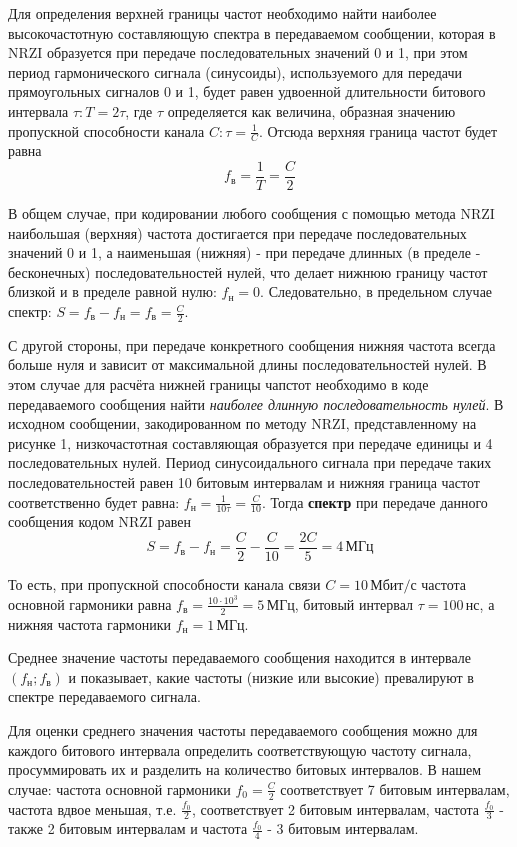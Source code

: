 Для определения верхней границы частот необходимо найти наиболее высокочастотную составляющую спектра в передаваемом сообщении, которая в NRZI образуется при передаче последовательных значений 0 и 1, при этом период гармонического сигнала (синусоиды), используемого для передачи прямоугольных сигналов 0 и 1, будет равен удвоенной длительности битового интервала $\tau: T = 2\tau$, где $\tau$ определяется как величина, образная значению пропускной способности канала $C: \tau = \frac{1}{C}$. Отсюда верхняя граница частот будет равна \[f_{\text{в}} = \frac{1}{T} = \frac{C}{2}\]

В общем случае, при кодировании любого сообщения с помощью метода NRZI наибольшая (верхняя) частота достигается при передаче последовательных значений 0 и 1, а наименьшая (нижняя) - при передаче длинных (в пределе - бесконечных) последовательностей нулей, что делает нижнюю границу частот близкой и в пределе равной нулю: $f_{\text{н}} = 0$. Следовательно, в предельном случае спектр: $S = f_{\text{в}} - f_{\text{н}} = f_{\text{в}} = \frac{C}{2}$.

С другой стороны, при передаче конкретного сообщения нижняя частота всегда больше нуля и зависит от максимальной длины последовательностей нулей. В этом случае для расчёта нижней границы чапстот необходимо в коде передаваемого сообщения найти \textit{наиболее длинную последовательность нулей}. В исходном сообщении, закодированном по методу NRZI, представленному на рисунке 1, низкочастотная составляющая образуется при передаче единицы и 4 последовательных нулей. Период синусоидального сигнала при передаче таких последовательностей равен 10 битовым интервалам и нижняя граница частот соответственно будет равна: $f_{\text{н}} = \frac{1}{10\tau} = \frac{C}{10}$. Тогда \textbf{спектр} при передаче данного сообщения кодом NRZI равен
\[
	S =  f_{\text{в}} - f_{\text{н}} = \frac{C}{2} - \frac{C}{10} = \frac{2C}{5} = 4 \, \text{МГц}
\]

То есть, при пропускной способности канала связи $C = 10 \, \text{Мбит/с}$ частота основной гармоники равна $f_{\text{в}} = \frac{10 \cdot 10^3}{2} = 5 \, \text{МГц}$, битовый интервал $\tau = 100 \, \text{нс}$, а нижняя частота гармоники $f_{\text{н}} = 1 \, \text{МГц}$.

Среднее значение частоты передаваемого сообщения находится в интервале $(f_{\text{н}};f_{\text{в}})$ и показывает, какие частоты (низкие или высокие) превалируют в спектре передаваемого сигнала.

Для оценки среднего значения частоты передаваемого сообщения можно для каждого битового интервала определить соответствующую частоту сигнала, просуммировать их и разделить на количество битовых интервалов. В нашем случае: частота основной гармоники $f_0 = \frac{C}{2}$ соответствует 7 битовым интервалам, частота вдвое меньшая, т.е. $\frac{f_0}{2}$, соответствует 2 битовым интервалам, частота $\frac{f_0}{3}$ - также 2 битовым интервалам и частота $\frac{f_0}{4}$ - 3 битовым интервалам.

